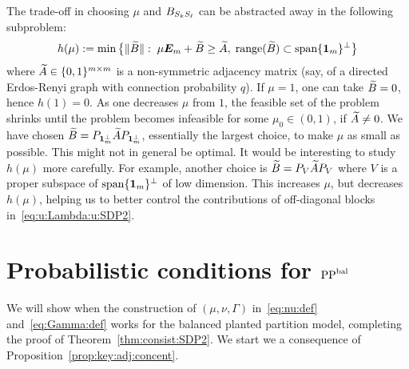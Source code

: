 \begin{rem}\label{rem:trade-off:mu:B}
    The trade-off in choosing $\mu$ and $B_{S_{k}S_{\ell}}$ can be abstracted away in the following subproblem:
    \begin{align*}
      h(\mu) := \min \big\{ \| \widetilde{B}\|: \; \mu \bm{E}_m + \widetilde{B} \ge \widetilde{A}, \;  \operatorname{range}(\widetilde{B}) \subset \operatorname{span}\{\bm{1}_m\}^\perp \big\}  
     \end{align*}
     where $\widetilde{A} \in \{0,1\}^{m \times m}$ is a non-symmetric adjacency matrix (say, of a directed Erdos-Renyi graph with connection probability $q$). If $\mu = 1$, one can take $\widetilde{B} = 0$, hence $h(1) = 0$. As one decreases $\mu$ from $1$, the feasible set of the problem shrinks until the problem becomes infeasible for some $\mu_0 \in (0,1)$, if $\widetilde{A} \neq 0$. We have chosen $\widetilde{B} = P_{\bm{1}_m^\perp} \widetilde{A} P_{\bm{1}_m^\perp}$, essentially the largest choice, to make $\mu$ as small as possible. This might not in general be optimal. It would be interesting to study $h(\mu)$ more carefully. For example, another choice is $\widetilde{B} = P_V \widetilde{A} P_V$ where $V$ is a proper subspace of $\operatorname{span}\{\bm{1}_m\}^\perp$ of low dimension. This increases $\mu$, but decreases $h(\mu)$, helping us to better control the contributions of off-diagonal blocks in~\eqref{eq:u:Lambda:u:SDP2}.
  \end{rem}


\section{Probabilistic conditions for $\text{PP}^{\text{bal}}$}\label{sec:prob:cond:ppbal}
We will show when the construction of $(\mu,\nu,\Gamma)$ in~\eqref{eq:nu:def} and~\eqref{eq:Gamma:def} works for the balanced planted partition model,  completing the proof of Theorem~\ref{thm:consist:SDP2}. We start we a consequence of Proposition~\ref{prop:key:adj:concent}.



